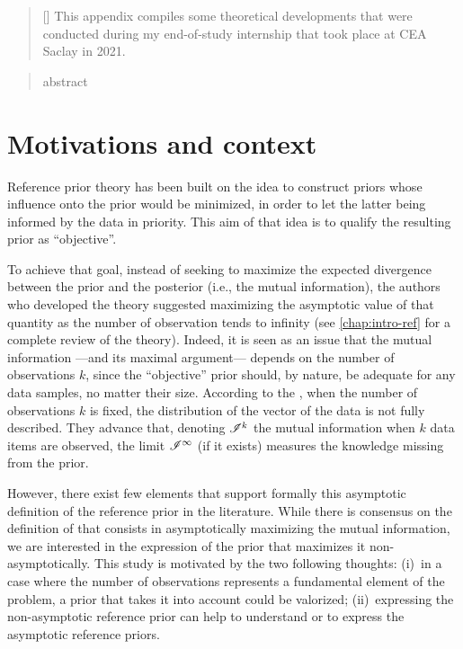 

\begin{abstract}[\hspace*{-10pt}]
    This appendix compiles some theoretical developments that were conducted during my end-of-study internship that took place at CEA Saclay in 2021. %
\end{abstract}


\begin{abstract}
    abstract
\end{abstract}


\minitoc

\section{Motivations and context}

Reference prior theory has been built on the idea to construct  priors whose influence onto the prior would be minimized, in order to let the latter being informed by the data in priority.
This aim of that idea is to qualify the resulting prior as ``objective''.

To achieve that goal, 
instead of seeking to maximize the expected divergence between the prior and the posterior (i.e., the mutual information), 
the authors who developed the theory \citep{bernardo_reference_1979,bernardo_bayesian_1994} suggested maximizing the asymptotic value of that quantity as the number of observation tends to infinity (see \cref{chap:intro-ref} for a complete review of the theory).
Indeed, it is seen as an issue that the mutual information ---and its maximal argument--- depends on the number of observations $k$, since the ``objective'' prior should, by nature, be adequate for any data samples, no matter their size.
According to the \citet{bernardo_bayesian_1994}, when the number of observations $k$ is fixed, the distribution of the vector of the data is not fully described. They advance that, denoting $\mathscr{I}^k$ the mutual information when $k$ data items are observed, the limit $\mathscr{I}^\infty$ (if it exists) measures the knowledge missing from the prior.




However, there exist few elements that support formally this asymptotic definition of the reference prior in the literature.
While there is consensus on the definition of \citet{bernardo_reference_1979} that consists in asymptotically maximizing the mutual information, we are interested in the expression of the prior that maximizes it non-asymptotically.
This study is motivated by the two following thoughts: (i)~in a case where the number of observations represents a fundamental element of the problem, a prior that takes it into account could be valorized; (ii)~expressing the non-asymptotic reference prior can help to understand or to express the asymptotic reference priors.

